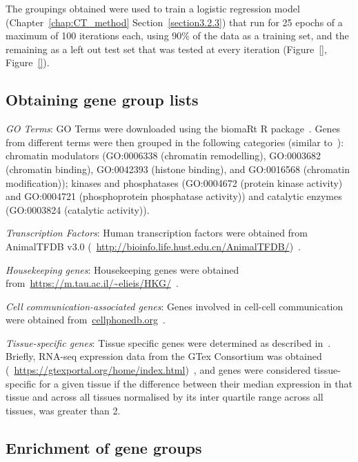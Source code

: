 The groupings obtained were used to train a logistic regression model (Chapter~\ref{chap:CT_method} Section~\ref{section3.2.3}) that run for 25 epochs of a maximum of 100 iterations each, using 90\% of the data as a training set, and the remaining as a left out test set that was tested at every iteration (Figure~\ref{}, Figure~\ref{}).


\subsection{Obtaining gene group lists}
\label{section4.4_genelists}
\textit{GO Terms}: GO Terms were downloaded using the biomaRt R package~\citep{durinck_mapping_2009}. Genes from different terms were then grouped in the following categories (similar to~\citep{hagai_gene_2018}): chromatin modulators (GO:0006338 (chromatin remodelling), GO:0003682 (chromatin binding), GO:0042393 (histone binding), and GO:0016568 (chromatin modification)); kinases and phosphatases (GO:0004672 (protein kinase activity) and GO:0004721 (phosphoprotein phosphatase activity)) and catalytic enzymes (GO:0003824 (catalytic activity)).

\textit{Transcription Factors}: Human transcription factors were obtained from AnimalTFDB v3.0 (~\url{http://bioinfo.life.hust.edu.cn/AnimalTFDB/})~\citep{hu_animaltfdb_2019}.

\textit{Housekeeping genes}: Housekeeping genes were obtained from~\url{https://m.tau.ac.il/~elieis/HKG/}~\citep{eisenberg_human_2013}.

\textit{Cell communication-associated genes}: Genes involved in cell-cell communication were obtained from~\url{cellphonedb.org}~\citep{efremova_cellphonedb_2019}.

\textit{Tissue-specific genes}: Tissue specific genes were determined as described in~\citep{sonawane_understanding_2017}. Briefly, RNA-seq expression data from the GTex Consortium was obtained (~\url{https://gtexportal.org/home/index.html})~\citep{consortium_genotype-tissue_2015}, and genes were considered tissue-specific for a given tissue if the difference between their median expression in that tissue and across all tissues normalised by its inter quartile range across all tissues, was greater than 2.


\subsection{Enrichment of gene groups}
\label{section4.4_enr}



